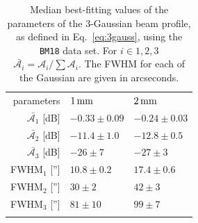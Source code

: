 \begin{table}[!th]
   \caption{{\lp Median best-fitting values of the parameters of the
  3-Gaussian beam profile, as defined in Eq.~\ref{eq:3gauss}, using
  the {\tt BM18} data set. For $i \in {1, 2, 3}$ $\bar{\mathcal{A}_i}
  =\mathcal{A}_i / \sum{\mathcal{A}_i}$.
  The FWHM for each of the Gaussian are given in arcseconds.}}
  \label{tab:mean_3gauss_fit}
  \begin{center}
    \begin{tabular}{rll}
      \hline\hline
      \noalign{\smallskip}
       parameters  &  $1\,\rm{mm}$  & $2\,\rm{mm}$ \\
       \noalign{\smallskip} 
      \hline
      \noalign{\smallskip} 
      $\bar{\mathcal{A}_1}$ [dB] &   $-0.33 \pm 0.09$   &  $-0.24 \pm 0.03$ \\
      $\bar{\mathcal{A}_2}$ [dB] &   $-11.4 \pm 1.0$     &  $-12.8 \pm 0.5$   \\
      $\bar{\mathcal{A}_3}$ [dB] &   $-26 \pm 7$       &  $-27 \pm 3$    \\
      FWHM$_1$  ['']             &   $10.8 \pm 0.2$    &  $17.4 \pm 0.6 $ \\
      FWHM$_2$  ['']             &   $30 \pm 2$        &  $42 \pm 3 $ \\
      FWHM$_3$  ['']             &   $81 \pm 10$       &  $99 \pm 7 $ \\     
       \noalign{\smallskip}   
      \hline
    \end{tabular}    
  \end{center}
\end{table}
%

